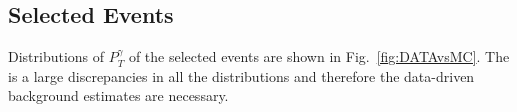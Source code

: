 
\subsection{Selected Events}


Distributions of $P_T^{\gamma}$ of the selected events are shown in Fig.~\ref{fig:DATAvsMC}. The is a large discrepancies in all the distributions and therefore the data-driven background estimates are necessary.

